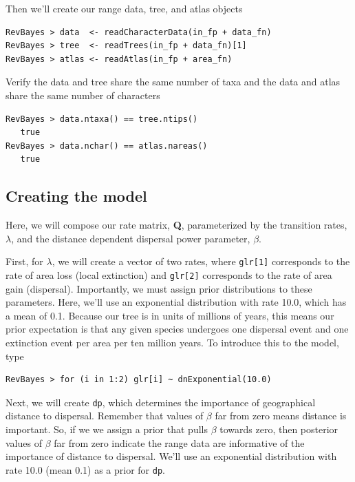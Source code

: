 \documentclass[11pt]{article}
\begin{document}
Then we'll create our range data, tree, and atlas objects

\begin{snugshade}
\begin{lstlisting}
RevBayes > data  <- readCharacterData(in_fp + data_fn)
RevBayes > tree  <- readTrees(in_fp + data_fn)[1]
RevBayes > atlas <- readAtlas(in_fp + area_fn)
\end{lstlisting}
\end{snugshade}

Verify the data and tree share the same number of taxa and the data and atlas share the same number of characters

\begin{snugshade}
\begin{lstlisting}
RevBayes > data.ntaxa() == tree.ntips()
   true
RevBayes > data.nchar() == atlas.nareas()
   true
\end{lstlisting}
\end{snugshade}


\subsection{Creating the model}

Here, we will compose our rate matrix, {\bf Q}, parameterized by the transition rates, $\lambda$, and the distance dependent dispersal power parameter, $\beta$.

First, for $\lambda$, we will create a vector of two rates, where {\tt glr[1]} corresponds to the rate of area loss (local extinction) and {\tt glr[2]} corresponds to the rate of area gain (dispersal).
Importantly, we must assign prior distributions to these parameters.
Here, we'll use an exponential distribution with rate 10.0, which has a mean of 0.1.
Because our tree is in units of millions of years, this means our prior expectation is that any given species undergoes one dispersal event and one extinction event per area per ten million years.
To introduce this to the model, type
\begin{snugshade}
\begin{lstlisting}
RevBayes > for (i in 1:2) glr[i] ~ dnExponential(10.0)
\end{lstlisting}
\end{snugshade}

Next, we will create {\tt dp}, which determines the importance of geographical distance to dispersal.
Remember that values of $\beta$ far from zero means distance is important.
So, if we we assign a prior that pulls $\beta$ towards zero, then posterior values of $\beta$ far from zero indicate the range data are informative of the importance of distance to dispersal.
We'll use an exponential distribution with rate 10.0 (mean 0.1) as a prior for {\tt dp}.
\end{document}
